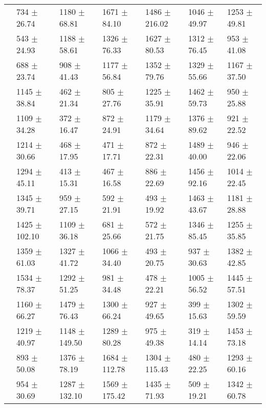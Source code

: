 \begin{table}
{\begin{tabular}[t]{rllllll}
\multirow{-2}{*}{\raggedleft\arraybackslash 7} & 734 $\pm$ 26.74 & 1180 $\pm$ 68.81 & 1671 $\pm$ 84.10 & 1486 $\pm$ 216.02 & 1046 $\pm$ 49.97 & 1253 $\pm$ 49.81\\
\cmidrule{1-7}
 & 543 $\pm$ 24.93 & 1188 $\pm$ 58.61 & 1326 $\pm$ 76.33 & 1627 $\pm$ 80.53 & 1312 $\pm$ 76.45 & 953 $\pm$ 41.08\\

\multirow{-2}{*}{\raggedleft\arraybackslash 8} & 688 $\pm$ 23.74 & 908 $\pm$ 41.43 & 1177 $\pm$ 56.84 & 1352 $\pm$ 79.76 & 1329 $\pm$ 55.66 & 1167 $\pm$ 37.50\\
\cmidrule{1-7}
 & 1145 $\pm$ 38.84 & 462 $\pm$ 21.34 & 805 $\pm$ 27.76 & 1225 $\pm$ 35.91 & 1462 $\pm$ 59.73 & 950 $\pm$ 25.88\\

\multirow{-2}{*}{\raggedleft\arraybackslash 9} & 1109 $\pm$ 34.28 & 372 $\pm$ 16.47 & 872 $\pm$ 24.91 & 1179 $\pm$ 34.64 & 1376 $\pm$ 89.62 & 921 $\pm$ 22.52\\
\cmidrule{1-7}
 & 1214 $\pm$ 30.66 & 468 $\pm$ 17.95 & 471 $\pm$ 17.71 & 872 $\pm$ 22.31 & 1489 $\pm$ 40.00 & 946 $\pm$ 22.06\\

\multirow{-2}{*}{\raggedleft\arraybackslash 10} & 1294 $\pm$ 45.11 & 413 $\pm$ 15.31 & 467 $\pm$ 16.58 & 886 $\pm$ 22.69 & 1456 $\pm$ 92.16 & 1014 $\pm$ 22.45\\
\cmidrule{1-7}
 & 1345 $\pm$ 39.71 & 959 $\pm$ 27.15 & 592 $\pm$ 21.91 & 493 $\pm$ 19.92 & 1463 $\pm$ 43.67 & 1181 $\pm$ 28.88\\

\multirow{-2}{*}{\raggedleft\arraybackslash 11} & 1425 $\pm$ 102.10 & 1109 $\pm$ 36.18 & 681 $\pm$ 25.66 & 572 $\pm$ 21.75 & 1346 $\pm$ 85.45 & 1255 $\pm$ 35.85\\
\cmidrule{1-7}
 & 1359 $\pm$ 61.03 & 1327 $\pm$ 41.72 & 1066 $\pm$ 34.40 & 493 $\pm$ 20.75 & 937 $\pm$ 30.63 & 1382 $\pm$ 42.85\\

\multirow{-2}{*}{\raggedleft\arraybackslash 12} & 1534 $\pm$ 78.37 & 1292 $\pm$ 51.25 & 981 $\pm$ 34.48 & 478 $\pm$ 22.21 & 1005 $\pm$ 56.52 & 1445 $\pm$ 57.51\\
\cmidrule{1-7}
 & 1160 $\pm$ 66.27 & 1479 $\pm$ 76.43 & 1300 $\pm$ 66.24 & 927 $\pm$ 49.65 & 399 $\pm$ 15.63 & 1302 $\pm$ 59.59\\

\multirow{-2}{*}{\raggedleft\arraybackslash 13} & 1219 $\pm$ 40.97 & 1148 $\pm$ 149.50 & 1289 $\pm$ 80.28 & 975 $\pm$ 49.38 & 319 $\pm$ 14.14 & 1453 $\pm$ 73.18\\
\cmidrule{1-7}
 & 893 $\pm$ 50.08 & 1376 $\pm$ 78.19 & 1684 $\pm$ 112.78 & 1304 $\pm$ 115.43 & 480 $\pm$ 22.25 & 1293 $\pm$ 60.16\\

\multirow{-2}{*}{\raggedleft\arraybackslash 14} & 954 $\pm$ 30.69 & 1287 $\pm$ 132.10 & 1569 $\pm$ 175.42 & 1435 $\pm$ 71.93 & 509 $\pm$ 19.21 & 1342 $\pm$ 60.78\\
\bottomrule
\end{tabular}}
\end{table}
